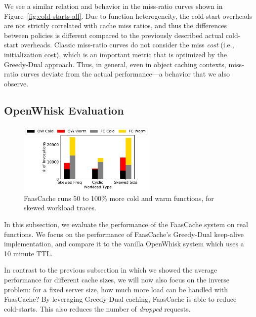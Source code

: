 

We see a similar relation and behavior in the miss-ratio curves shown in Figure~\ref{fig:cold-starts-all}. 
Due to function heterogeneity, the cold-start overheads are not strictly correlated with cache miss ratios, and thus the differences between policies is different compared to the previously described actual cold-start overheads. 
Classic miss-ratio curves do not consider the miss \emph{cost} (i.e., initialization cost), which is an important metric that is optimized by the Greedy-Dual approach.
Thus, in general, even in object caching contexts, miss-ratio curves deviate from the actual performance---a behavior that we also observe. 

\subsection{OpenWhisk Evaluation}
\label{subsec:ow-eval}



\begin{figure}
  \centering
  \includegraphics[width=0.6\textwidth]{faascache/faas-keepalive-20/graphs/litmus_tests/litmus_2_stacked.pdf}
  \caption{FaasCache runs 50 to 100\% more cold and warm functions, for skewed workload traces.}
  \label{fig:litmus_2}  
\end{figure}


In this subsection, we evaluate the performance of the FaasCache system on real functions. 
We focus on the performance of FaasCache's Greedy-Dual keep-alive implementation, and compare it to the vanilla OpenWhisk system which uses a 10 minute TTL.


In contrast to the previous subsection in which we showed the average performance for different cache sizes, we will now also focus on the inverse problem: for a fixed server size, how much more load can be handled with FaasCache? 
By leveraging Greedy-Dual caching, FaasCache is able to reduce cold-starts. 
This also reduces the number of \emph{dropped} requests. %

